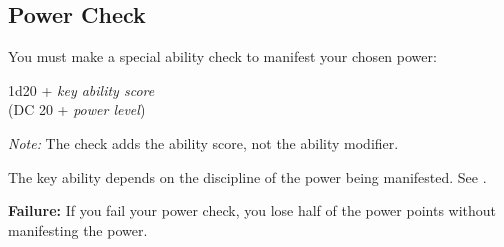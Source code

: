 \subsection{Power Check}
You must make a special ability check to manifest your chosen power:

\begin{Formula}{1d20 + \textit{key ability score}\\(DC 20 + \textit{power level})}
\end{Formula}

\textit{Note:} The check adds the ability score, not the ability modifier.

The key ability depends on the discipline of the power being manifested. See .


\textbf{Failure:} If you fail your power check, you lose half of the power points without manifesting the power.
